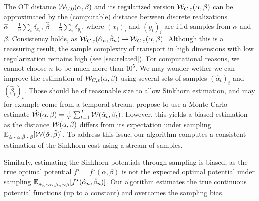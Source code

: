 The OT distance $\mathcal{W}_{C,0}(\alpha,\beta)$ and its regularized version
$\mathcal{W}_{C,\varepsilon}(\alpha,\beta)$ can be approximated by the (computable)
distance between discrete realizations $\hat \alpha = \frac{1}{n} \sum_i
\delta_{x_i}$, $\hat \beta = \frac{1}{n} \sum_i \delta_{y_i}$, where ${(x_i)}_i$
and ${(y_i)}_i$ are i.i.d samples from $\alpha$ and $\beta$.  Consistency holds,
as $\mathcal{W}_{C,\varepsilon}(\hat \alpha_n, \hat \beta_n) \to \mathcal{W}_{C,\varepsilon}(\alpha,
\beta)$. Although this is a reassuring result, the sample complexity of
transport in high dimensions with low regularization remains high (see
\autoref{sec:related}). For computational reasons, we cannot choose $n$ to be
much more than $10^5$. We may wonder wether we can improve the estimation of
$\mathcal{W}_{C,\varepsilon}(\alpha,\beta)$ using several sets of samples $(\hat
\alpha_t)_t$ and ${(\hat \beta_t)}_t$. Those should be of reasonable size to
allow Sinkhorn estimation, and may for example come from a temporal stream.
\citet{2018-Genevay-aistats} propose to use a Monte-Carlo estimate $\hat
{\mathcal{W}}(\alpha, \beta) = \frac{1}{T} \sum_{t=1}^T \mathcal{W}(\hat \alpha_t, \beta_t)$.
However, this yields a biased estimation as the distance $\mathcal{W}(\alpha,
\beta)$ differs from its expectation under sampling $\mathbb{E}_{\hat \alpha \sim
\alpha, \hat \beta \sim \beta} [\mathcal{W}(\hat \alpha, \hat \beta)]$. To address this
issue, our algorithm computes a consistent estimation of the Sinkhorn cost
using a stream of samples.

Similarly, estimating the Sinkhorn potentials through sampling is biased, as
the true optimal potential $f^\star=f^\star(\alpha, \beta)$ is not the expected
optimal potential under sampling $\mathbb{E}_{\hat \alpha_n \sim \alpha, \hat \beta_n
\sim \beta}[f^\star(\hat \alpha_n, \hat \beta_n)]$. Our algorithm estimates the
true continuous potential functions (up to a constant) and overcomes the sampling
bias.


